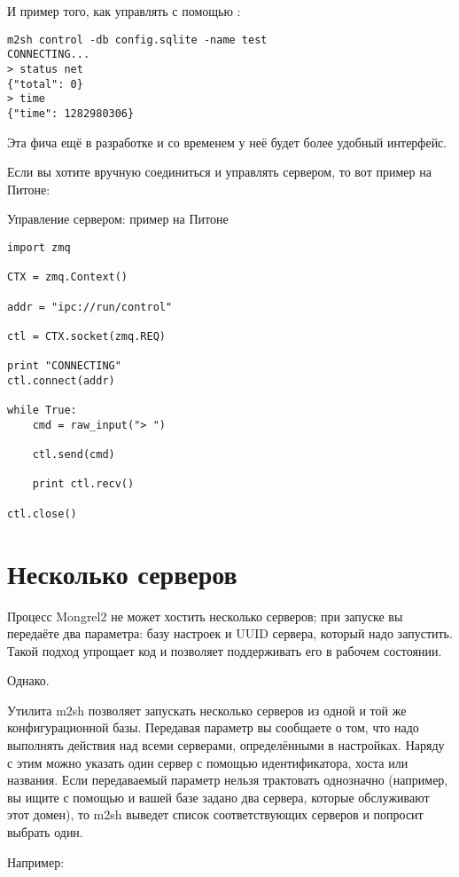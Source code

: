 И пример того, как управлять с помощью :

\begin{Verbatim}
m2sh control -db config.sqlite -name test
CONNECTING...
> status net
{"total": 0}
> time
{"time": 1282980306}
\end{Verbatim}

Эта фича ещё в разработке и со временем у неё будет более удобный
интерфейс.

Если вы хотите вручную соединиться и управлять сервером, то вот пример
на Питоне:


\begin{code}{Управление сервером: пример на Питоне}
\begin{lstlisting}
import zmq

CTX = zmq.Context()

addr = "ipc://run/control"

ctl = CTX.socket(zmq.REQ)

print "CONNECTING"
ctl.connect(addr)

while True:
    cmd = raw_input("> ")

    ctl.send(cmd)

    print ctl.recv()

ctl.close()
\end{lstlisting}
\end{code}

\section{Несколько серверов}

Процесс Mongrel2 не может хостить несколько серверов; при запуске вы
передаёте два параметра: базу настроек и UUID сервера, который надо
запустить. Такой подход упрощает код и позволяет поддерживать его в
рабочем состоянии.

Однако.

Утилита m2sh позволяет запускать несколько серверов из одной и той же
конфигурационной базы. Передавая параметр  вы сообщаете
о том, что надо выполнять действия над всеми серверами, определёнными
в настройках. Наряду с этим можно указать один сервер с помощью
идентификатора, хоста или названия. Если передаваемый параметр нельзя
трактовать однозначно (например, вы ищите с помощью  и вашей базе задано два сервера, которые обслуживают этот
домен), то m2sh выведет список соответствующих серверов и попросит
выбрать один.

Например:

